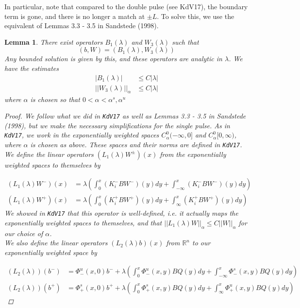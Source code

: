 \documentclass[12pt]{article}
\def\R{{\mathbb R}}
\newtheorem{lemma}{Lemma}
\begin{document}
In particular, note that compared to the double pulse (see \textrm{KdV17}), the boundary term is gone, and there is no longer a match at $\pm L$. To solve this, we use the equivalent of Lemmas 3.3 - 3.5 in Sandstede (1998).

\begin{lemma}\label{inv1}
There exist operators $B_1(\lambda)$ and $W_3(\lambda)$ such that 
\[
(b, W) = (B_1(\lambda), W_3(\lambda))
\]
Any bounded solution is given by this, and these operators are analytic in $\lambda$. We have the estimates
\begin{align*}
|B_1(\lambda)| &\leq C|\lambda| \\
||W_3(\lambda)||_\alpha &\leq C|\lambda|
\end{align*}
where $\alpha$ is chosen so that $0 < \alpha < \alpha^s, \alpha^u$
\begin{proof}
We follow what we did in \texttt{KdV17} as well as Lemmas 3.3 - 3.5 in Sandstede (1998), but we make the necessary simplifications for the single pulse. As in \texttt{KdV17}, we work in the exponentially weighted spaces $C^0_\alpha(-\infty, 0]$ and $C^0_\alpha[0, \infty)$, where $\alpha$ is chosen as above. These spaces and their norms are defined in \texttt{KdV17}. We define the linear operators $(L_1(\lambda)W^\pm)(x)$ from the exponentially weighted spaces to themselves by

\begin{align*}
(L_1(\lambda)W^-)(x) &= \lambda \left( \int_0^x (K_i^- B W^-)(y) dy + \int_{-\infty}^x (K_i^-B W^-)(y) dy \right) \\
(L_1(\lambda)W^+)(x) &= \lambda \left( \int_0^x (K_i^+ B W^+)(y) dy + \int_{\infty}^x (K_i^+ B W^+)(y) dy \right)
\end{align*}
We showed in \texttt{KdV17} that this operator is well-defined, i.e. it actually maps the exponentially weighted spaces to themselves, and that $||L_1(\lambda)W||_\alpha \leq C||W||_\alpha$ for our choice of $\alpha$.\\

We also define the linear operators $(L_2(\lambda)b)(x)$ from $\R^n$ to our exponentially weighted space by

\begin{align*}
(L_2(\lambda))(b^-) &= \Phi^u_-(x, 0)b^- + \lambda \left( \int_0^x \Phi^u_-(x, y) B Q(y)dy + \int_{-\infty}^x \Phi^s_-(x, y)B Q(y) dy \right)\\
(L_2(\lambda))(b^+) &= \Phi^s_+(x, 0)b^+ + \lambda \left( \int_0^x \Phi^s_+(x, y) B Q(y) dy + \int_{\infty}^x \Phi^u_+(x, y) B Q(y) dy \right)
\end{align*}


\end{proof}
\end{lemma}
\end{document}
